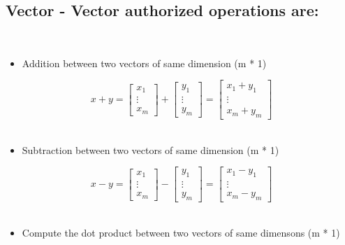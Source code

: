 \documentclass[]{article}
\providecommand{\tightlist}{%
  \setlength{\itemsep}{0pt}\setlength{\parskip}{0pt}}
\begin{document}
\hypertarget{vector---vector-authorized-operations-are}{%
\subsection{Vector - Vector authorized operations
are:}\label{vector---vector-authorized-operations-are}}

​

\begin{itemize}
\tightlist
\item
  Addition between two vectors of same dimension (m * 1)
\end{itemize}

\large

\[
x + y = 
\begin{bmatrix} x_1 \\ \vdots \\ x_m\end{bmatrix} + 
\begin{bmatrix} y_1 \\ \vdots \\ y_m\end{bmatrix} 
= \begin{bmatrix} x_1 + y_1 \\ \vdots \\ x_m + y_m \end{bmatrix}
\] \normalsize ​

\begin{itemize}
\tightlist
\item
  Subtraction between two vectors of same dimension (m * 1)
\end{itemize}

\large

\[
x - y = 
\begin{bmatrix} x_1 \\ \vdots \\ x_m\end{bmatrix} - 
\begin{bmatrix} y_1 \\ \vdots \\ y_m\end{bmatrix} 
= \begin{bmatrix} x_1 - y_1 \\ \vdots \\ x_m - y_m \end{bmatrix}
\] \normalsize ​

\begin{itemize}
\tightlist
\item
  Compute the dot product between two vectors of same dimensons (m * 1)
\end{itemize}
\end{document}
